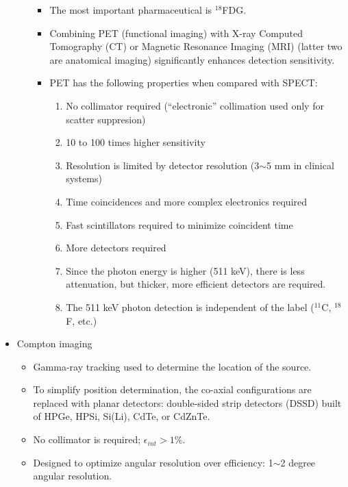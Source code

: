\begin{itemize}
\begin{enumerate}
\begin{itemize}
            \item The most important pharmaceutical is $^{18}$FDG.
            \item Combining PET (functional imaging) with X-ray Computed Tomography (CT) or Magnetic Resonance Imaging (MRI) (latter two are anatomical imaging) significantly enhances detection sensitivity.
            \item PET has the following properties when compared with SPECT:
            \begin{enumerate}
                \item No collimator required (``electronic'' collimation used only for scatter suppresion)
                \item 10 to 100 times higher sensitivity
                \item Resolution is limited by detector resolution (3$\sim$5 mm in clinical systems)
                \item Time coincidences and more complex electronics required
                \item Fast scintillators required to minimize coincident time
                \item More detectors required
                \item Since the photon energy is higher (511 keV), there is less attenuation, but thicker, more efficient detectors are required.
                \item The 511 keV photon detection is independent of the label ($^{11}$C, $^{18}$F, etc.)
            \end{enumerate}
        \end{itemize}
    \end{enumerate}
    \item Compton imaging
    \begin{itemize}
        \item Gamma-ray tracking used to determine the location of the source.
        \item To simplify position determination, the co-axial configurations are replaced with planar detectors: double-sided strip detectors (DSSD) built of HPGe, HPSi, Si(Li), CdTe, or CdZnTe. 
        \item No collimator is required; $\epsilon_{int}>1\%$.
        \item Designed to optimize angular resolution over efficiency: 1$\sim$2 degree angular resolution. 
    \end{itemize}
\end{itemize}